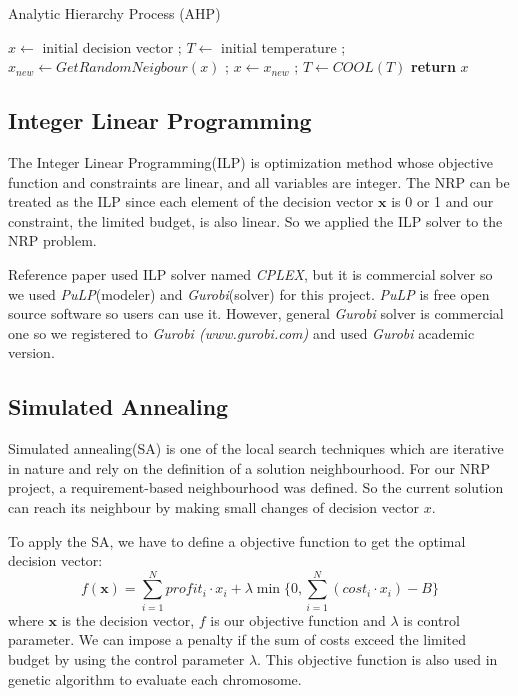 \begin{algorithm}
\caption{Analytic Hierarchy Process (AHP)}\label{alg:AHP}
\begin{algorithmic}
    \State $x \gets$ initial decision vector ;
    \State $T \gets$ initial temperature ; 
        \State $x_{new} \gets GetRandomNeigbour(x)$ ;
            \State $x \gets x_{new}$ ;
        \EndIf
        \State $T \gets COOL(T)$ 
    \EndWhile
    \textbf{return} $x$
\end{algorithmic}
\end{algorithm}

\subsection{Integer Linear Programming}
The Integer Linear Programming(ILP) is optimization method whose objective function and constraints are linear, and all variables are integer. The NRP can be treated as the ILP since each element of the decision vector $\textbf{x}$ is 0 or 1 and our constraint, the limited budget, is also linear. So we applied the ILP solver to the NRP problem.

Reference paper\cite{ILP} used ILP solver named \textit{CPLEX}, but it is commercial solver so we used \textit{PuLP}(modeler) and \textit{Gurobi}(solver) for this project. \textit{PuLP} is free open source software so users can use it. However, general \textit{Gurobi} solver is commercial one so we registered to \textit{Gurobi (www.gurobi.com)} and used \textit{Gurobi} academic version.

\subsection{Simulated Annealing}
Simulated annealing(SA) is one of the local search techniques which are iterative in nature and rely on the definition of a solution neighbourhood. For our NRP project, a requirement-based neighbourhood was defined. So the current solution can reach its neighbour by making small changes of decision vector $x$.

To apply the SA, we have to define a objective function to get the optimal decision vector:
\[
f(\textbf{x}) = \sum_{i = 1}^{N} profit_i \cdot x_i + \lambda \min \Big\{0, \sum_{i = 1}^{N} (cost_i \cdot x_i) - B \Big\}
\]
where $\textbf{x}$ is the decision vector, $f$ is our objective function and $\lambda$ is control parameter. We can impose a penalty if the sum of costs exceed the limited budget by using the control parameter $\lambda$. This objective function is also used in genetic algorithm to evaluate each chromosome.

